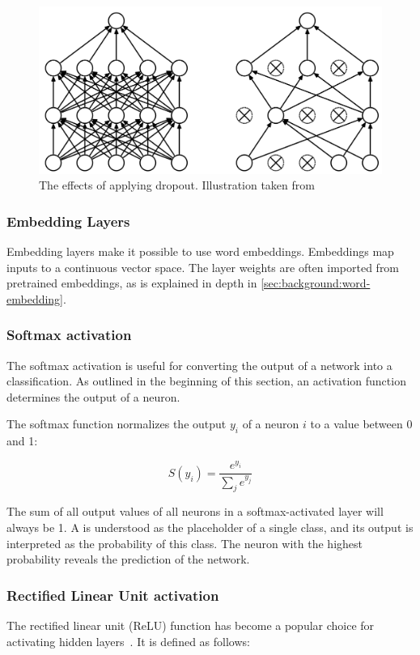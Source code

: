 \begin{figure}
  \centering
  \includegraphics[width=\textwidth]{gfx/dropout-application.png}
  \caption[Effects of applying dropout]{The effects of applying dropout. Illustration taken from~\cite{srivastava2014dropout}}
  \label{fig:dropout-application}
\end{figure}

\subsubsection*{Embedding Layers}
Embedding layers make it possible to use word embeddings.
Embeddings map inputs to a continuous vector space.
The layer weights are often imported from pretrained embeddings, as is explained in depth in \autoref{sec:background:word-embedding}.

\subsubsection*{Softmax activation}
The softmax activation is useful for converting the output of a network into a classification.
As outlined in the beginning of this section, an activation function determines the output of a neuron.

The softmax function normalizes the output $y_i$ of a neuron $i$ to a value between 0 and 1:

$$S(y_i) = \frac{e^{y_i}}{\sum_j e^{y_j}}$$

The sum of all output values of all neurons in a softmax-activated layer will always be 1.
A is understood as the placeholder of a single class, and its output is interpreted as the probability of this class.
The neuron with the highest probability reveals the prediction of the network.

\subsubsection*{Rectified Linear Unit activation}
The rectified linear unit (ReLU) function has become a popular choice for activating hidden layers~\cite{glorot2011deep}. It is defined as follows:


